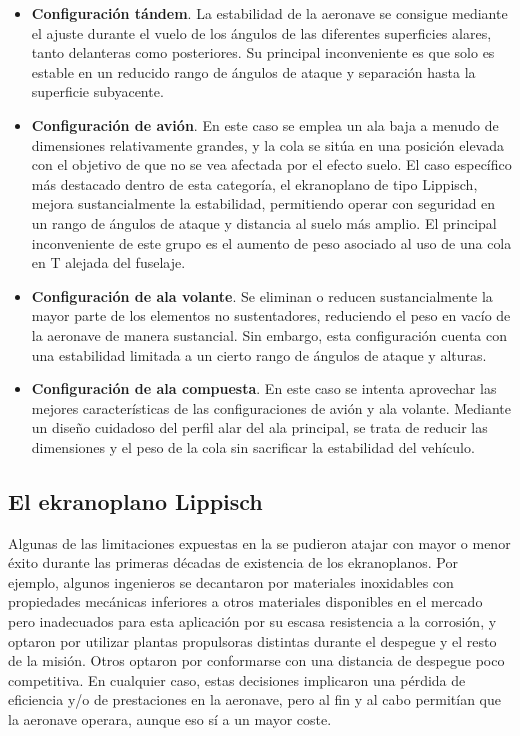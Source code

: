 \begin{itemize}
\item \textbf{Configuración tándem}. La estabilidad de la aeronave se consigue mediante el ajuste durante el vuelo de los ángulos de las diferentes superficies alares, tanto delanteras como posteriores. Su principal inconveniente es que solo es estable en un reducido rango de ángulos de ataque y separación hasta la superficie subyacente.
\item \textbf{Configuración de avión}. En este caso se emplea un ala baja a menudo de dimensiones relativamente grandes, y la cola se sitúa en una posición elevada con el objetivo de que no se vea afectada por el efecto suelo. El caso específico más destacado dentro de esta categoría, el ekranoplano de tipo Lippisch, mejora sustancialmente la estabilidad, permitiendo operar con seguridad en un rango de ángulos de ataque y distancia al suelo más amplio. El principal inconveniente de este grupo es el aumento de peso asociado al uso de una cola en T alejada del fuselaje.
\item \textbf{Configuración de ala volante}. Se eliminan o reducen sustancialmente la mayor parte de los elementos no sustentadores, reduciendo el peso en vacío de la aeronave de manera sustancial. Sin embargo, esta configuración cuenta con una estabilidad limitada a un cierto rango de ángulos de ataque y alturas.
\item \textbf{Configuración de ala compuesta}. En este caso se intenta aprovechar las mejores características de las configuraciones de avión y ala volante. Mediante un diseño cuidadoso del perfil alar del ala principal, se trata de reducir las dimensiones y el peso de la cola sin sacrificar la estabilidad del vehículo.
\end{itemize}


\subsection{El ekranoplano Lippisch}
\label{sec:wig:lippisch}

Algunas de las limitaciones expuestas en la  se pudieron atajar con mayor o menor éxito durante las primeras décadas de existencia de los ekranoplanos. Por ejemplo, algunos ingenieros se decantaron por materiales inoxidables con propiedades mecánicas inferiores a otros materiales disponibles en el mercado pero inadecuados para esta aplicación por su escasa resistencia a la corrosión, y optaron por utilizar plantas propulsoras distintas durante el despegue y el resto de la misión. Otros optaron por conformarse con una distancia de despegue poco competitiva. En cualquier caso, estas decisiones implicaron una pérdida de eficiencia y/o de prestaciones en la aeronave, pero al fin y al cabo permitían que la aeronave operara, aunque eso sí a un mayor coste.

